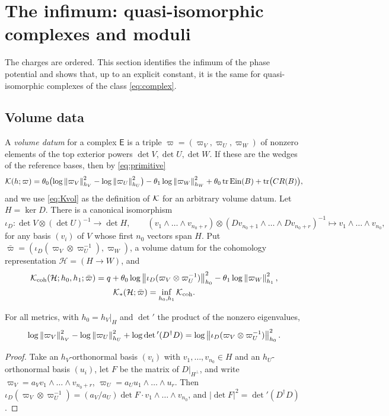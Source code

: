 \section{The infimum: quasi-isomorphic complexes and moduli}\label{sec:moduli}

The charges are ordered. This section identifies the infimum of the phase
potential and shows that, up to an explicit constant, it is the same for
quasi-isomorphic complexes of the class \eqref{eq:complex}.

\subsection{Volume data}
A \emph{volume datum} for a complex $\mathsf E$ is a triple
$\varpi=(\varpi_V,\varpi_U,\varpi_W)$ of nonzero elements of the top exterior
powers $\det V,\det U,\det W$. If these are the wedges of the reference bases,
then by \eqref{eq:primitive}
\begin{equation}\label{eq:Kvol}
 \mathcal K(h;\varpi)=\theta_0\bigl(\log\left\lVert\varpi_V\right\rVert^2_{h_V}-\log\left\lVert\varpi_U\right\rVert^2_{h_U}\bigr)
 -\theta_1\log\left\lVert\varpi_W\right\rVert^2_{h_W}+\theta_0\operatorname{tr}\operatorname{Ein}(B)+\operatorname{tr}\bigl(CR(B)\bigr),
\end{equation}
and we use \eqref{eq:Kvol} as the definition of $\mathcal K$ for an arbitrary volume
datum. Let $H=\ker D$. There is a canonical isomorphism
\[
 \iota_D:\det V\otimes(\det U)^{-1}\to\det H,\qquad
 (v_1\wedge\dots\wedge v_{n_0+r})\otimes(Dv_{n_0+1}\wedge\dots\wedge Dv_{n_0+r})^{-1}
 \mapsto v_1\wedge\dots\wedge v_{n_0},
\]
for any basis $(v_i)$ of $V$ whose first $n_0$ vectors span $H$. Put
$\bar\varpi=(\iota_D(\varpi_V\otimes\varpi_U^{-1}),\varpi_W)$, a volume datum
for the cohomology representation $\mathcal H=(H\to W)$, and
\begin{gather*}
 \mathcal K_{\mathrm{coh}}(\mathcal H;h_0,h_1;\bar\varpi)=q+\theta_0\log\left\lVert\iota_D(\varpi_V\otimes\varpi_U^{-1})\right\rVert^2_{h_0}
 -\theta_1\log\left\lVert\varpi_W\right\rVert^2_{h_1},\\
 \mathcal K_*(\mathcal H;\bar\varpi)=\inf_{h_0,h_1}\mathcal K_{\mathrm{coh}}.
\end{gather*}

\begin{lemma}\label{lem:determinant}
For all metrics, with $h_0=h_V|_H$ and $\det{}'$ the product of the nonzero
eigenvalues,
\[
 \log\left\lVert\varpi_V\right\rVert^2_{h_V}-\log\left\lVert\varpi_U\right\rVert^2_{h_U}+\log\det{}'(D^\dagger D)
 =\log\left\lVert\iota_D(\varpi_V\otimes\varpi_U^{-1})\right\rVert^2_{h_0}.
\]
\end{lemma}

\begin{proof}
Take an $h_V$-orthonormal basis $(v_i)$ with $v_1,\dots,v_{n_0}\in H$ and an
$h_U$-orthonormal basis $(u_i)$, let $F$ be the matrix of $D|_{H^\perp}$, and
write $\varpi_V=a_Vv_1\wedge\dots\wedge v_{n_0+r}$,
$\varpi_U=a_Uu_1\wedge\dots\wedge u_r$. Then
$\iota_D(\varpi_V\otimes\varpi_U^{-1})=(a_V/a_U)\det F\cdot v_1\wedge\dots\wedge v_{n_0}$,
and $|\det F|^2=\det{}'(D^\dagger D)$.
\end{proof}

